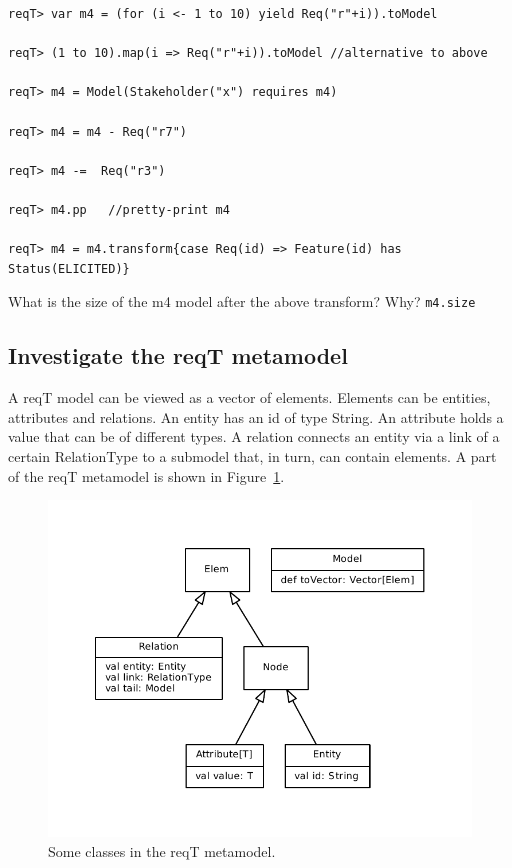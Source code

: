 \documentclass[11pt]{article}
\begin{document}
\begin{framed}
{\scriptsize\begin{verbatim}
reqT> var m4 = (for (i <- 1 to 10) yield Req("r"+i)).toModel

reqT> (1 to 10).map(i => Req("r"+i)).toModel //alternative to above

reqT> m4 = Model(Stakeholder("x") requires m4)

reqT> m4 = m4 - Req("r7")

reqT> m4 -=  Req("r3")

reqT> m4.pp   //pretty-print m4

reqT> m4 = m4.transform{case Req(id) => Feature(id) has Status(ELICITED)}
\end{verbatim}}
\end{framed}
\begin{framed}\noindent
What is the size of the m4 model after the above transform? Why?
\newline
\verb+m4.size+
\newline
\newline \underline{\hspace{10cm}}
\end{framed}

\subsection{Investigate the reqT metamodel}

A reqT model can be viewed as a vector of elements. Elements can be entities, attributes and relations. An entity has an id of type String. An attribute holds a value that can be of different types. A relation connects an entity via a link of a certain RelationType to a submodel that, in turn, can contain elements. A part of the reqT metamodel is shown in Figure~\ref{fig:metamodel}. 

\begin{figure}[h]
    \centering
    \includegraphics[width=\textwidth]{metamodel-simple.pdf}
    \caption{Some classes in the reqT metamodel.}
    \label{fig:metamodel}
\end{figure}
\end{document}
